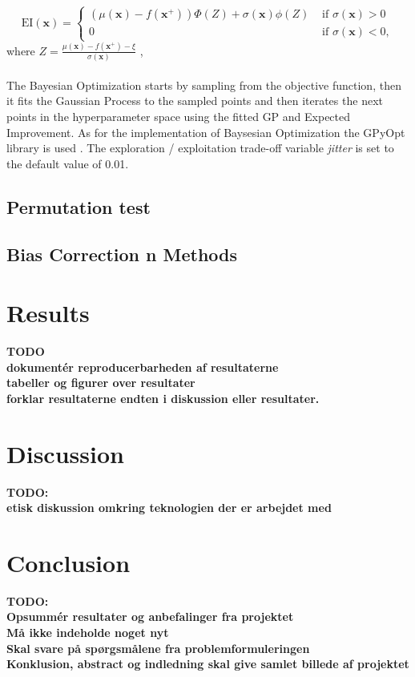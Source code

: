 \documentclass[11pt, fleqn, titlepage]{article}
\begin{document}
	\begin{equation*}
	\mathrm{EI}(\mathbf{x})=\left\{\begin{array}{ll}
	\left(\mu(\mathbf{x})-f\left(\mathbf{x}^{+}\right)\right) \Phi(Z)+\sigma(\mathbf{x}) \phi(Z) & \text { if } \sigma(\mathbf{x})>0 \\
	0 & \text { if } \sigma(\mathbf{x})<0,
	\end{array}\right. 
	\end{equation*}
	where $ Z = \frac{\mu(\mathbf{x}) - f(\mathbf{x}^+) - \xi }{\sigma(\mathbf{x})}$ , \cite{aktiv_bo} 
	\\\\
	The Bayesian Optimization starts by sampling from the objective function, then it fits the Gaussian Process to the sampled points and then iterates the next points in the hyperparameter space using the fitted GP and Expected Improvement. As for the implementation of Baysesian Optimization the GPyOpt library is used \cite{bo_lib}. The exploration / exploitation trade-off variable \textit{jitter} is set to the default value of 0.01.
	
	\subsection{Permutation test}
	
	
	\subsection{Bias Correction	n Methods}
	
	\section{Results}
	\textbf{TODO \\ dokumentér reproducerbarheden af resultaterne \\ tabeller og figurer over resultater \\ forklar resultaterne endten i diskussion eller resultater.}
	
	\section{Discussion}
	\textbf{TODO: \\ etisk diskussion omkring teknologien der er arbejdet med}
	
	\section{Conclusion}
	\textbf{TODO: \\ Opsummér resultater og anbefalinger fra projektet \\ Må ikke indeholde noget nyt \\ Skal svare på spørgsmålene fra problemformuleringen \\ Konklusion, abstract og indledning skal give samlet billede af projektet}
	
\end{document}
